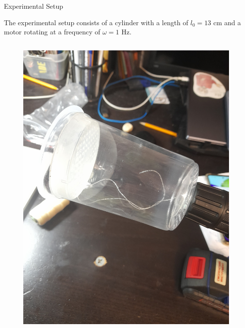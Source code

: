 \begin{frame}{Experimental Setup}

\begin{block}{}
The experimental setup consists of a cylinder with a length of $l_0 = 13$ cm and a motor rotating at a frequency of $\omega = 1$ Hz.
\end{block}

\begin{columns}
\begin{column}{0.4\linewidth}
\begin{figure}[H]
\includegraphics[width=1\linewidth]{img/experiment.jpg}
\end{figure}
\end{column}


\end{columns}
\end{frame}
